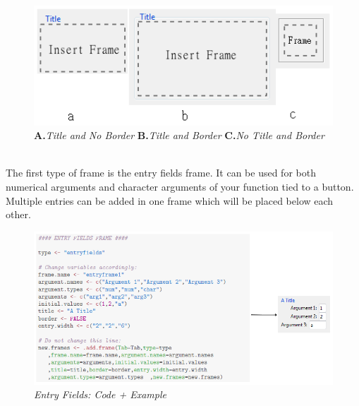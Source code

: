 \documentclass[a4paper]{article}\usepackage[]{graphicx}\usepackage[]{color}
\begin{document}
\begin{figure}[H]
\centering
\includegraphics[scale=0.8]{figures/title_border.png}
\caption{{\bf A.}{\it Title and No Border} {\bf B.}{\it Title and Border} {\bf
C.}{\it No Title and Border}
\label{titleborder}}
\end{figure}


\\
\noindent The first type of frame is the entry fields frame. It can be used for
both numerical arguments and character arguments of your function tied to a
button. Multiple entries can be added in one frame which will be placed below
each other.
\begin{figure}[H]
\centering
\includegraphics[scale=0.5]{figures/entryfields.png}
\caption{{\it Entry Fields: Code + Example}
\label{entryfields}}
\end{figure}
\end{document}
